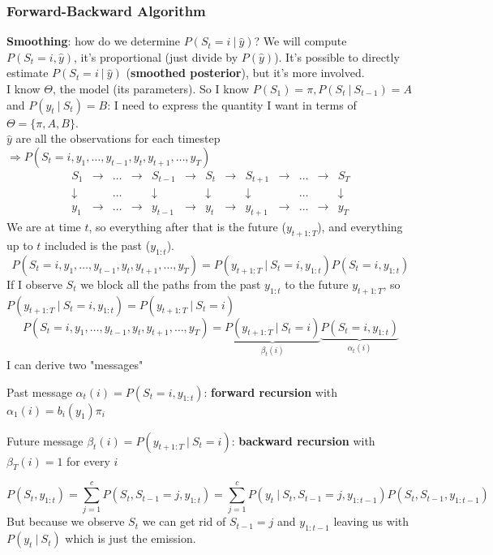 \documentclass[10pt]{report}
\begin{document}
\subsubsection{Forward-Backward Algorithm} \textbf{Smoothing}: how do we determine $P(S_t = i\:|\:\hat{y})$? We will compute $P(S_t=i, \hat{y})$, it's proportional (just divide by $P(\hat{y})$). It's possible to directly estimate $P(S_t = i\:|\:\hat{y})$ (\textbf{smoothed posterior}), but it's more involved.\\
I know $\Theta$, the model (its parameters). So I know $P(S_1) = \pi, P(S_t\:|\:S_{t-1}) = A$ and $P(y_t\:|\:S_t) = B$: I need to express the quantity I want in terms of $\Theta=\{\pi,A,B\}$.\\
$\hat{y}$ are all the observations for each timestep $\Rightarrow P(S_t=i,y_1,\ldots,y_{t-1},y_t,y_{t+1},\ldots,y_T)$
$$\begin{array}{ccccccccccccc}
S_1&\rightarrow&\ldots&\rightarrow&S_{t-1}&\rightarrow&S_t&\rightarrow&S_{t+1}&\rightarrow&\ldots&\rightarrow&S_T\\
\downarrow& &\ldots& &\downarrow& &\downarrow& &\downarrow& &\ldots& &\downarrow\\
y_1&\rightarrow&\ldots&\rightarrow&y_{t-1}&\rightarrow&y_t&\rightarrow&y_{t+1}&\rightarrow&\ldots&\rightarrow&y_T
\end{array}$$
We are at time $t$, so everything after that is the future ($y_{t+1:T}$), and everything up to $t$ included is the past ($y_{1:t}$).
$$P(S_t=i,y_1,\ldots,y_{t-1},y_t,y_{t+1},\ldots,y_T) = P(y_{t+1:T}\:|\:S_t=i, y_{1:t}) P(S_t=i,y_{1:t})$$
If I observe $S_t$ we block all the paths from the past $y_{1:t}$ to the future $y_{t+1:T}$, so $P(y_{t+1:T}\:|\:S_t=i, y_{1:t}) = P(y_{t+1:T}\:|\:S_t=i)$
$$P(S_t=i,y_1,\ldots,y_{t-1},y_t,y_{t+1},\ldots,y_T) = \underset{\beta_t(i)}{\underbrace{P(y_{t+1:T}\:|\:S_t=i)}} \underset{\alpha_t(i)}{\underbrace{P(S_t=i,y_{1:t})}}$$
I can derive two "messages"
\begin{list}{}{}
	\item Past message $\alpha_t(i) = P(S_t=i,y_{1:t})$: \textbf{forward recursion} with $\alpha_1(i)=b_i(y_1)\pi_i$
	\item Future message $\beta_t(i) = P(y_{t+1:T}\:|\:S_t=i)$: \textbf{backward recursion} with $\beta_T(i) = 1$ for every $i$
\end{list}
$$P(S_t,y_{1:t}) = \sum_{j=1}^c P(S_t, S_{t-1}=j,y_{1:t}) = \sum_{j=1}^c P(y_t\:|\:S_t, S_{t-1} = j, y_{1:t-1})P(S_t,S_{t-1},y_{1:t-1})$$
But because we observe $S_t$ we can get rid of $S_{t-1}=j$ and $y_{1:t-1}$ leaving us with $P(y_t\:|\:S_t)$ which is just the emission.\\
\end{document}
